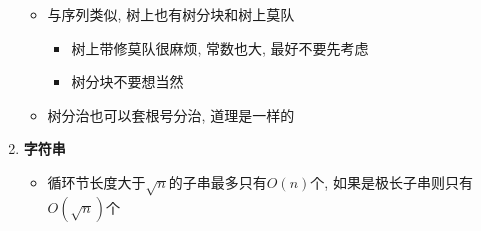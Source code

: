 \begin{enumerate}
\begin{itemize}
	\item 与序列类似, 树上也有树分块和树上莫队
		\begin{itemize}
			\item 树上带修莫队很麻烦, 常数也大, 最好不要先考虑
			\item 树分块不要想当然
		\end{itemize}
	\item 树分治也可以套根号分治, 道理是一样的
\end{itemize}

\item \textbf{字符串}

\begin{itemize}
	\item 循环节长度大于$\sqrt n$的子串最多只有$O(n)$个, 如果是极长子串则只有$O(\sqrt n)$个
\end{itemize}

\end{enumerate}